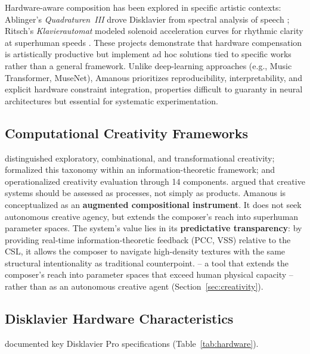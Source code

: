 \documentclass[a4paper]{article}
\theoremstyle{definition}
\theoremstyle{remark}
\begin{document}
Hardware-aware composition has been explored in specific artistic contexts: Ablinger's \emph{Quadraturen~III} drove Disklavier from spectral analysis of speech \citep{ablinger2004quadraturen}; Ritsch's \emph{Klavierautomat} modeled solenoid acceleration curves for rhythmic clarity at superhuman speeds \citep{ritsch2011robotic}. These projects demonstrate that hardware compensation is artistically productive but implement ad hoc solutions tied to specific works rather than a general framework. Unlike deep-learning approaches (e.g., Music Transformer, MuseNet), Amanous prioritizes reproducibility, interpretability, and explicit hardware constraint integration, properties difficult to guaranty in neural architectures but essential for systematic experimentation.

\subsection{Computational Creativity Frameworks}
\label{sec:bg_creativity}

\citet{boden2004creative} distinguished exploratory, combinational, and transformational creativity; \citet{wiggins2006preliminary} formalized this taxonomy within an information-theoretic framework; and \citet{jordanous2012standardised} operationalized creativity evaluation through 14 components. \citet{loughran2017limitations} argued that creative systems should be assessed as processes, not simply as products. Amanous is conceptualized as an \textbf{augmented compositional instrument}. It does not seek autonomous creative agency, but extends the composer's reach into superhuman parameter spaces. The system's value lies in its \textbf{predictative transparency}: by providing real-time information-theoretic feedback (PCC, VSS) relative to the CSL, it allows the composer to navigate high-density textures with the same structural intentionality as traditional counterpoint. -- a tool that extends the composer's reach into parameter spaces that exceed human physical capacity -- rather than as an autonomous creative agent (Section~\ref{sec:creativity}).

\subsection{Disklavier Hardware Characteristics}
\label{sec:bg_hardware}

\citet{goebl2003measurement} documented key Disklavier Pro specifications (Table~\ref{tab:hardware}).
\end{document}
